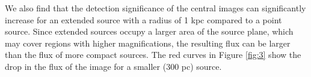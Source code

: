 \documentclass[chicago]{emulateapj}
\begin{document}
We also find that the detection significance of the central images can significantly increase for an extended source with a radius of 1 kpc compared to a point source. Since extended sources occupy a larger area of the source plane, which may cover regions with higher magnifications, the resulting flux can be larger than the flux of more compact sources. The red curves in Figure \ref{fig:3} show the drop in the flux of the image for a smaller (300 pc) source. 
\end{document}
